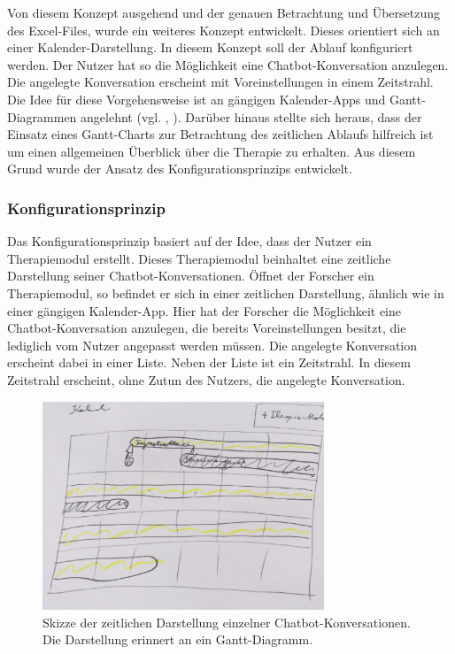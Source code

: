 Von diesem Konzept ausgehend und der genauen Betrachtung und Übersetzung des Excel-Files, wurde ein weiteres Konzept entwickelt. Dieses orientiert sich an einer Kalender-Darstellung. In diesem Konzept soll der Ablauf konfiguriert werden. Der Nutzer hat so die Möglichkeit eine Chatbot-Konversation anzulegen. Die angelegte Konversation erscheint mit Voreinstellungen in einem Zeitstrahl. Die Idee für diese Vorgehensweise ist an gängigen Kalender-Apps und Gantt-Diagrammen angelehnt (vgl. \cite{GoogleKa75:online}, \cite{MailundK42:online}). Darüber hinaus stellte sich heraus, dass der Einsatz eines Gantt-Charts zur Betrachtung des zeitlichen Ablaufs hilfreich ist um einen allgemeinen Überblick über die Therapie zu erhalten. Aus diesem Grund wurde der Ansatz des Konfigurationsprinzips entwickelt. 

\subsubsection{Konfigurationsprinzip}
Das Konfigurationsprinzip basiert auf der Idee, dass der Nutzer ein Therapiemodul erstellt. Dieses Therapiemodul beinhaltet eine zeitliche Darstellung seiner Chatbot-Konversationen. Öffnet der Forscher ein Therapiemodul, so befindet er sich in einer zeitlichen Darstellung, ähnlich wie in einer gängigen Kalender-App. Hier hat der Forscher die Möglichkeit eine Chatbot-Konversation anzulegen, die bereits Voreinstellungen besitzt, die lediglich vom Nutzer angepasst werden müssen. Die angelegte Konversation erscheint dabei in einer Liste. Neben der Liste ist ein Zeitstrahl. In diesem Zeitstrahl erscheint, ohne Zutun des Nutzers, die angelegte Konversation.  


\begin{figure}[h]
\centering
\includegraphics[width=0.75\textwidth]{pictures/moduluebersicht}
\caption{Skizze der zeitlichen Darstellung einzelner Chatbot-Konversationen. Die Darstellung erinnert an ein Gantt-Diagramm.}
\label{moduluebersicht}
\end{figure}

